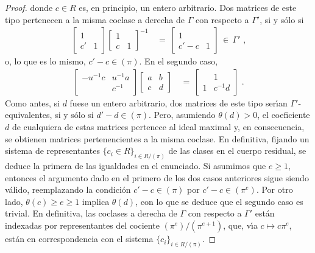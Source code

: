 \begin{proof}
	donde $c\in R$ es, en principio, un entero arbitrario. Dos matrices
	de este tipo pertenecen a la misma coclase a derecha de $\Gamma$ con
	respecto a $\Gamma'$, si y s\'{o}lo si
	\begin{align*}
		\begin{bmatrix} 1 & \\ c' & 1 \end{bmatrix}
			\begin{bmatrix} 1 & \\ c & 1 \end{bmatrix}^{-1}
		& \,=\,\begin{bmatrix} 1 & \\ c'-c & 1 \end{bmatrix}
			\,\in\,\Gamma'
		\text{ ,}
	\end{align*}
	o, lo que es lo mismo, $c'-c\in (\pi)$. En el segundo caso,
	\begin{align*}
		\begin{bmatrix} -u^{-1}c & u^{-1}a \\ & c^{-1} \end{bmatrix}
			\begin{bmatrix} a & b \\ c & d \end{bmatrix}
		& \,=\, \begin{bmatrix} & 1 \\ 1 & c^{-1}d \end{bmatrix}
		\text{ .}
	\end{align*}
	Como antes, si $d$ fuese un entero arbitrario, dos matrices de este
	tipo ser\'{\i}an $\Gamma'$-equivalentes, si y s\'{o}lo si
	$d'-d\in (\pi)$. Pero, asumiendo $\theta(d)>0$, el coeficiente
	$d$ de cualquiera de estas matrices pertenece al ideal maximal y, en
	consecuencia, se obtienen matrices pertenencientes a la misma coclase.
	En definitiva, fijando un sistema de representantes
	$\{c_{i}\in R\}_{i\in R/(\pi)}$ de las clases en el cuerpo residual,
	se deduce la primera de las igualdades en el enunciado. Si asumimos
	que $e\geq 1$, entonces el argumento dado en el primero de los dos
	casos anteriores sigue siendo v\'{a}lido, reemplazando la condici\'{o}n
	$c'-c\in (\pi)$ por $c'-c\in (\pi^{e})$. Por otro lado,
	$\theta(c)\geq e\geq 1$ implica $\theta(d)$, con lo que se deduce que
	el segundo caso es trivial. En definitiva, las coclases a derecha
	de $\Gamma$ con respecto a $\Gamma'$ est\'{a}n indexadas por
	representantes del cociente $(\pi^{e})/(\pi^{e+1})$, que,
	v\'{\i}a $c\mapsto c\pi^{e}$, est\'{a}n en correspondencia con el
	sistema $\{c_{i}\}_{i\in R/(\pi)}$.
\end{proof}

